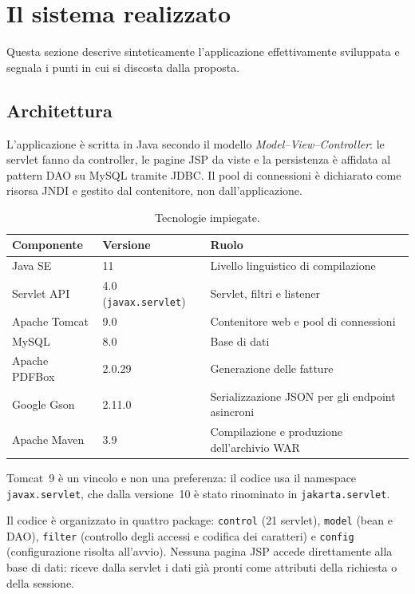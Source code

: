 \documentclass[11pt,a4paper]{article}
\begin{document}
\clearpage
\section{Il sistema realizzato}

Questa sezione descrive sinteticamente l'applicazione effettivamente sviluppata
e segnala i punti in cui si discosta dalla proposta.

\subsection{Architettura}

L'applicazione è scritta in Java secondo il modello \emph{Model--View--Controller}:
le servlet fanno da controller, le pagine JSP da viste e la persistenza è
affidata al pattern DAO su MySQL tramite JDBC. Il pool di connessioni è dichiarato
come risorsa JNDI e gestito dal contenitore, non dall'applicazione.

\begin{table}[H]
  \centering
  \small
  \begin{tabular}{llp{6.4cm}}
    \toprule
    \textbf{Componente} & \textbf{Versione} & \textbf{Ruolo} \\
    \midrule
    Java SE             & 11 & Livello linguistico di compilazione \\
    Servlet API         & 4.0 (\texttt{javax.servlet}) & Servlet, filtri e listener \\
    Apache Tomcat       & 9.0 & Contenitore web e pool di connessioni \\
    MySQL               & 8.0 & Base di dati \\
    Apache PDFBox       & 2.0.29 & Generazione delle fatture \\
    Google Gson         & 2.11.0 & Serializzazione JSON per gli endpoint asincroni \\
    Apache Maven        & 3.9 & Compilazione e produzione dell'archivio WAR \\
    \bottomrule
  \end{tabular}
  \caption{Tecnologie impiegate.}\label{tab:tecnologie}
\end{table}

Tomcat~9 è un vincolo e non una preferenza: il codice usa il namespace
\texttt{javax.servlet}, che dalla versione~10 è stato rinominato in
\texttt{jakarta.servlet}.

Il codice è organizzato in quattro package: \texttt{control} (21 servlet),
\texttt{model} (bean e DAO), \texttt{filter} (controllo degli accessi e codifica
dei caratteri) e \texttt{config} (configurazione risolta all'avvio). Nessuna
pagina JSP accede direttamente alla base di dati: riceve dalla servlet i dati già
pronti come attributi della richiesta o della sessione.
\end{document}
